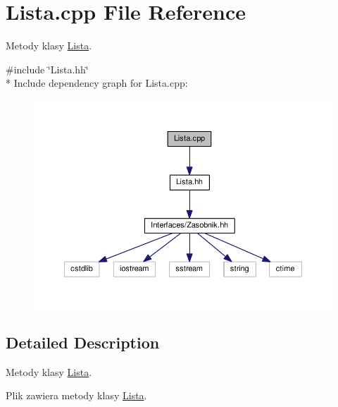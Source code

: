 \hypertarget{a00047}{}\section{Lista.\+cpp File Reference}
\label{a00047}


Metody klasy \hyperlink{a00014}{Lista}.  


{\ttfamily \#include \char`\"{}Lista.\+hh\char`\"{}}\\*
Include dependency graph for Lista.\+cpp\+:
\nopagebreak
\begin{figure}[H]
\begin{center}
\leavevmode
\includegraphics[width=350pt]{a00100}
\end{center}
\end{figure}


\subsection{Detailed Description}
Metody klasy \hyperlink{a00014}{Lista}. 

Plik zawiera metody klasy \hyperlink{a00014}{Lista}. 